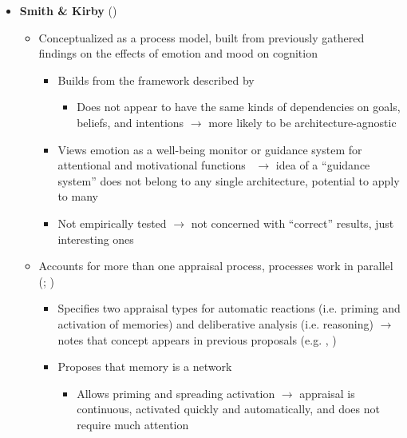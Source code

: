 \begin{itemize}
    \item \textbf{Smith \& Kirby} (\strong)
    \begin{itemize}
        \item Conceptualized as a process model, built from previously gathered
        findings on the effects of emotion and mood on
        cognition~\citep[p.~85]{smith2000consequences}
        \begin{itemize}
            \item Builds from the framework described by
            \cite{smith1990emotion}~\citep[p.~122]{smith2001toward}
            \begin{itemize}
                \item Does not appear to have the same kinds of dependencies on
                goals, beliefs, and intentions $\rightarrow$ more likely to be
                architecture-agnostic
            \end{itemize}

            \item Views emotion as a well-being monitor or guidance system for
            attentional and motivational
            functions~\citep[p.~90--91]{smith2000consequences} $\rightarrow$
            idea of a ``guidance system'' does not belong to any single
            architecture, potential to apply to many

            \item Not empirically tested $\rightarrow$ \progname{} not
            concerned with ``correct'' results, just interesting ones
        \end{itemize}

        \item Accounts for more than one appraisal process, processes work in
        parallel (;
        )
        \begin{itemize}
            \item Specifies two appraisal types for automatic reactions (i.e.
            priming and activation of memories) and deliberative analysis (i.e.
            reasoning) $\rightarrow$ notes that concept appears in previous
            proposals (e.g. \cite{leventhal1987relationship},
            \cite{sloman2005architectural})

            \item Proposes that memory is a network~\citep[p.~94,
            102]{smith2000consequences}
            \begin{itemize}
                \item Allows priming and spreading activation $\rightarrow$
                appraisal is continuous, activated quickly and automatically,
                and does not require much attention


\end{itemize}
\end{itemize}
\end{itemize}
\end{itemize}
